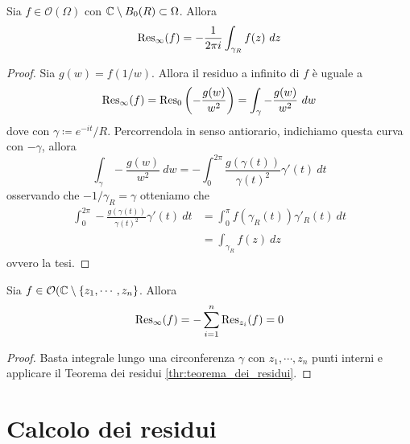 \begin{lemma}
  Sia $f \in \mathcal{O}(\Omega)$ con $\mathbb{C} \setminus B_0(R) \subset \Omega$.
  Allora 
  \begin{equation*}
    \operatorname{Res}_\infty (f) = -\frac{1}{2\pi i } \int_{\gamma_R} f(z)\ dz
  \end{equation*}
  \label{lem:residuo_a_infinito}
\end{lemma}
\begin{proof}
  Sia $g(w) = f(1/w)$. Allora il residuo a infinito di $f$ è uguale a 
  \begin{equation*}
    \operatorname{Res}_\infty(f) = \operatorname{Res}_0\left(-\frac{g(w)}{w^2}  \right) = \int_{\gamma}
    -\frac{g(w)}{w^2}\ dw
  \end{equation*}
  dove con $\gamma \coloneqq e^{-it}/R$. Percorrendola in senso antiorario,
  indichiamo questa curva con $-\gamma$, allora
  \begin{equation*}
    \int_{\gamma} -\frac{g(w)}{w^2}\ dw  = - \int_{0}^{2\pi}
    \frac{g(\gamma(t))}{\gamma(t)^2} \gamma'(t)\ dt 
  \end{equation*}
  osservando che $-1/\gamma_R = \gamma$ otteniamo che 
  \begin{align*}
     \int_{0}^{2\pi} -\frac{g(\gamma(t))}{\gamma(t)^2} \gamma'(t)\ dt
     & = \int_{0}^{\pi} f(\gamma_R(t)) \gamma'_R(t) \ dt\\
     & = \int_{\gamma_R} f(z)\ dz
  \end{align*}
  ovvero la tesi.
\end{proof}

\begin{corollary}
  Sia $f \in \mathcal{O}(\mathbb{C} \setminus \left\{ z_1, \cdots, z_n \right\}$. Allora 
    \begin{equation*}
      \operatorname{Res}_\infty(f) = - \sum_{i=1}^{n} \operatorname{Res}_{z_i}(f) = 0
    \end{equation*}
\end{corollary}
\begin{proof}
  Basta integrale lungo una circonferenza $\gamma$ con $z_1, \cdots, z_n$ punti
  interni e applicare il Teorema dei residui \ref{thr:teorema_dei_residui}.
\end{proof}


\section{Calcolo dei residui}

